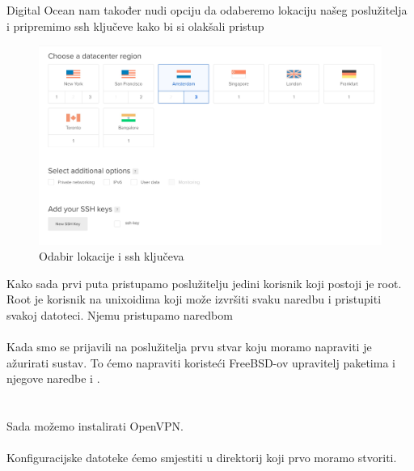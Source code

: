     \newpage
    \noindent
    Digital Ocean nam također nudi opciju da odaberemo lokaciju našeg poslužitelja
    i pripremimo ssh ključeve kako bi si olakšali pristup
    \begin{figure}[h]
        \centering
        \includegraphics[scale=0.15]{slike/lokacijaIssh}
        \caption{Odabir lokacije i ssh ključeva}
    \end{figure}

    Kako sada prvi puta pristupamo poslužitelju jedini korisnik
    koji postoji je root. Root je korisnik na unixoidima koji može izvršiti
    svaku naredbu i pristupiti svakoj datoteci. Njemu pristupamo naredbom \\
    
    \noindent
     \\

    Kada smo se prijavili na poslužitelja prvu stvar koju moramo napraviti je
    ažurirati sustav. To ćemo napraviti koristeći FreeBSD-ov upravitelj
    paketima  i njegove naredbe  i . \\

    \noindent
     \\
     \\

    Sada možemo instalirati OpenVPN. \\

    \noindent
     \\

    Konfiguracijske datoteke ćemo smjestiti u direktorij
     koji prvo moramo stvoriti. \\

    \noindent
     \\

